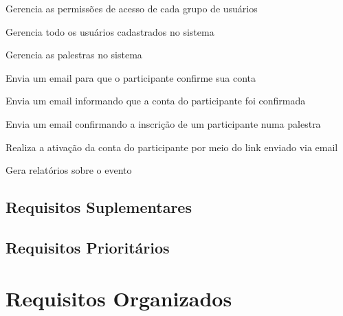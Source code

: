 \documentclass[12pt,a4paper]{article}
\begin{document}
        	{Gerencia as permissões de acesso de cada grupo de usuários}
        	{%
        	
        	}
			
        	{Gerencia todo os usuários cadastrados no sistema}
        	{%
        	
        	}
			
        	{Gerencia as palestras no sistema}
        	{%
        	
        	}
			
			
			
        	{Envia um email para que o participante confirme sua conta}
        	{%
        	
        	}
			
        	{Envia um email informando que a conta do participante foi confirmada}
        	{%
        	
        	}

        	{Envia um email confirmando a inscrição de um participante numa palestra}
        	{%
        	
        	}
			
        	{Realiza a ativação da conta do participante por meio do link enviado via email}
        	{%
        	
        	}

        	{Gera relatórios sobre o evento}
        	{%
        	
        	}

        	\clearpage
        	\subsection{Requisitos Suplementares}
        	
        	\subsection{Requisitos Prioritários}
        	
        	\clearpage
        	\section{Requisitos Organizados}
\end{document}
